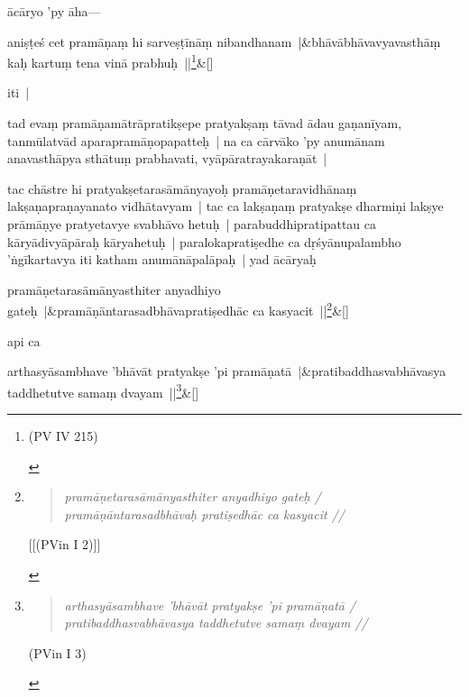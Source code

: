 \documentclass[article,a4paper]{memoir}
\newcommand{\persName}[1]{#1}
\begin{document}
	

	  \pstart \persName{ā\-cā\-ryo} 'py ā\-ha—
	\pend
      
	    
	    \stanza[\smallbreak]
aniṣṭeś cet pramā\-ṇaṃ hi sarveṣṭī\-nā\-ṃ nibandhanam |&bhā\-vā\-bhā\-vavyavasthā\-ṃ kaḥ kartuṃ tena vinā\- prabhuḥ ||\footnote{\begin{english}(PV IV 215)\end{english}}\&[\smallbreak]


	

	  \pstart iti |
	\pend
      

	  \pstart tad evaṃ pramā\-ṇamā\-trā\-pratikṣepe pratyakṣaṃ tā\-vad ā\-dau gaṇanī\-yam, tanmū\-latvā\-d aparapramā\-ṇopapatteḥ | na ca cā\-rvā\-ko 'py anumā\-nam anavasthā\-pya sthā\-tuṃ prabhavati, vyā\-pā\-ratrayakaraṇā\-t | 
	\pend
      

	  \pstart tac chā\-stre hi pratyakṣetarasā\-mā\-nyayoḥ pramā\-ṇetaravidhā\-naṃ lakṣaṇapraṇayanato vidhā\-tavyam | tac ca lakṣaṇaṃ pratyakṣe dharmiṇi lakṣye prā\-mā\-ṇye pratyetavye svabhā\-vo hetuḥ | parabuddhipratipattau ca kā\-ryā\-divyā\-pā\-raḥ kā\-ryahetuḥ | paralokapratiṣedhe ca dṛśyā\-nupalambho 'ṅgī\-kartavya iti katham anumā\-nā\-palā\-paḥ | yad ā\-cā\-ryaḥ 
	\pend
      
	    
	    \stanza[\smallbreak]
pramā\-ṇetarasā\-mā\-nyasthiter anyadhiyo gateḥ |&pramā\-ṇā\-ntarasadbhā\-vapratiṣedhā\-c ca kasyacit ||\footnote{\begin{english}
	    \begin{verse}
	  \textit{pramā\-ṇetarasā\-mā\-nyasthiter anyadhiyo gateḥ /}\\
	    \textit{pramā\-ṇā\-ntarasadbhā\-vaḥ pratiṣedhā\-c ca kasyacit //}\\
	    
	    \end{verse}
	   [[(PVin I 2)]]\end{english}}\&[\smallbreak]


	

	  \pstart api ca
	\pend
      
	    
	    \stanza[\smallbreak]
arthasyā\-sambhave 'bhā\-vā\-t pratyakṣe 'pi pramā\-ṇatā\- |&pratibaddhasvabhā\-vasya taddhetutve samaṃ dvayam ||\footnote{\begin{english}
	    \begin{verse}
	  \textit{arthasyā\-sambhave 'bhā\-vā\-t pratyakṣe 'pi pramā\-ṇatā\- /}\\
	    \textit{pratibaddhasvabhā\-vasya taddhetutve samaṃ dvayam //}\\
	    
	    \end{verse}
	   (PVin I 3)\end{english}}\&[\smallbreak]
\end{document}
